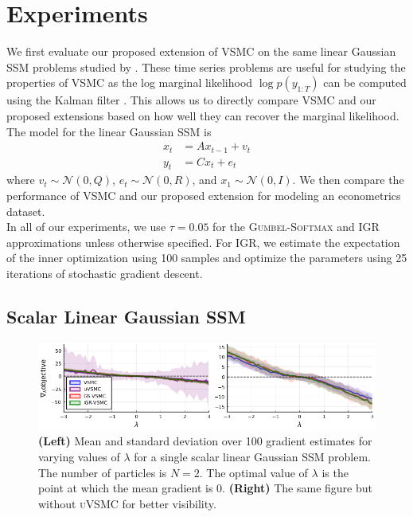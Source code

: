 \documentclass[12pt]{article}
\newcommand{\vsmc}{\textsc{VSMC}\xspace}
\newcommand{\uvsmc}{\textsc{uVSMC}\xspace}
\newcommand{\gumbelsoftmax}{\textsc{Gumbel-Softmax}\xspace}
\newcommand{\igr}{\textsc{IGR}\xspace}
\newcommand{\ssm}{\textsc{SSM}\xspace}
\begin{document}
\section{Experiments}\label{sec:experiments}

We first evaluate our proposed extension of \vsmc on the same linear Gaussian \ssm problems studied by \textcite{Naesseth:2018}. These time series problems are useful for studying the properties of \vsmc as the log marginal likelihood $\log p(y_{1:T})$ can be computed using the Kalman filter \parencite{Jong:1988}. This allows us to directly compare \vsmc and our proposed extensions based on how well they can recover the marginal likelihood. The model for the linear Gaussian \ssm is
\begin{align*}
x_t &= Ax_{t-1} + v_t \\
y_t &= Cx_t + e_t
\end{align*}
where $v_t\sim\mathcal{N}(0,Q)$, $e_t\sim\mathcal{N}(0,R)$, and $x_1\sim\mathcal{N}(0,I)$. We then compare the performance of \vsmc and our proposed extension for modeling an econometrics dataset.
\\

In all of our experiments, we use $\tau=0.05$ for the \gumbelsoftmax and \igr approximations unless otherwise specified. For \igr, we estimate the expectation of the inner optimization using 100 samples and optimize the parameters using 25 iterations of stochastic gradient descent.

\subsection{Scalar Linear Gaussian \ssm}

\begin{figure}[t]
\centering
\includegraphics[width=\textwidth]{figures/grad_est_var.png}
\caption{\textbf{(Left)} Mean and standard deviation over 100 gradient estimates for varying values of $\lambda$ for a single scalar linear Gaussian \ssm problem. The number of particles is $N=2$. The optimal value of $\lambda$ is the point at which the mean gradient is 0. \textbf{(Right)} The same figure but without \uvsmc for better visibility.}
\label{fig:grad_est_var}
\end{figure}
\end{document}
